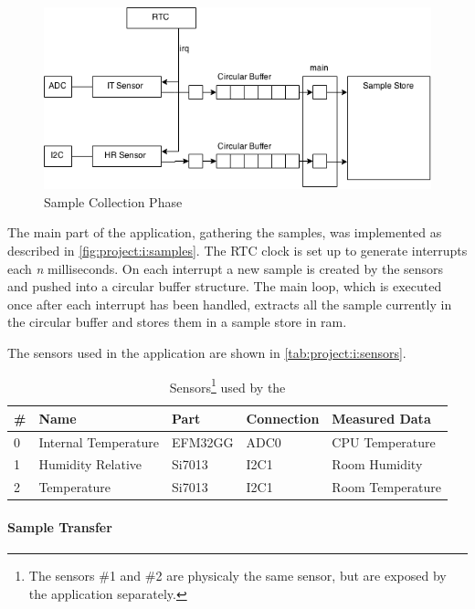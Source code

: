 \begin{figure}[H]
  \begin{center}
    \includegraphics[scale=0.5]{figures/project-i.png}
  \end{center}
  \caption{Sample Collection Phase}
  \label{fig:project:i:samples}
\end{figure}
The main part of the application, gathering the samples, was implemented as described in \autoref{fig:project:i:samples}.
The RTC clock is set up to generate interrupts each \emph{n} milliseconds.
On each interrupt a new sample is created by the sensors and pushed into a circular buffer structure.
The main loop, which is executed once after each interrupt has been handled, extracts all the sample currently in the circular buffer and stores them in a sample store in \gls{ram}.

The sensors used in the application are shown in \autoref{tab:project:i:sensors}.

\begin{table}[H]
  \centering
  \begin{tabular}{ l | l | l | l | l }
    \textbf{\#} & \textbf{Name} & \textbf{Part} & \textbf{Connection} & \textbf{Measured Data} \\
    \hline
    0 & Internal Temperature & EFM32GG & ADC0 & CPU Temperature \\
    1 & Humidity Relative & Si7013 & I2C1 & Room Humidity \\
    2 & Temperature & Si7013 & I2C1 & Room Temperature \\
    \hline
  \end{tabular}
  \caption{Sensors\footnote{The sensors \#1 and \#2 are physicaly the same sensor, but are exposed by the application separately.} used by the {\tracker}}
  \label{tab:project:i:sensors}
\end{table}

\paragraph{Sample Transfer}


